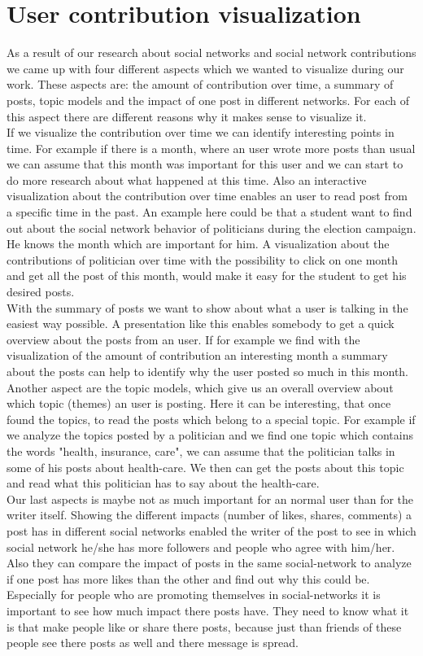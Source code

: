 \section{User contribution visualization}

As a result of our research about social networks and social network contributions we came up with four different aspects which we wanted to visualize during our work. These aspects are: the amount of contribution over time, a summary of posts, topic models and the impact of one post in different networks. For each of this aspect there are different reasons why it makes sense to visualize it. \\
If we visualize the contribution over time we can identify interesting points in time. For example if there is a month, where an user wrote more posts than usual we can assume that this month was important for this user and we can start to do more research about what happened at this time. Also an interactive visualization about the contribution over time enables an user to read post from a specific time in the past. An example here could be that a student want to find out about the social network behavior of politicians during the election campaign. He knows the month which are important for him. A visualization about the contributions of politician over time with the possibility to click on one month and get all the post of this month, would make it easy for the student to get his desired posts. \\
With the summary of posts we want to show about what a user is talking in the easiest way possible. A presentation like this enables somebody to get a quick overview about the posts from an user. If for example we find with the visualization of the amount of contribution an interesting month  a summary about the posts can help to identify why the user posted so much in this month. \\
Another aspect are the topic models, which give us an overall overview about which topic (themes) an user is posting. Here it can be interesting, that once found the topics, to read the posts which belong to a special topic. For example if we analyze the topics posted by a politician and we find one topic which contains the words "health, insurance, care", we can assume that the politician talks  in some of his posts about health-care. We then can get the posts about this topic and read what this politician has to say about the health-care. \\
Our last aspects is maybe not as much important for an normal user than for the writer itself. Showing the different impacts (number of likes, shares, comments) a post has in different social networks enabled the writer of the post to see in which social network he/she has more followers and people who agree with him/her. Also they can compare the impact of posts in the same social-network to analyze if one post has more likes than the other and find out why this could be.  Especially for people who are promoting themselves in social-networks it is important to see how much impact there posts have. They need to know what it is that make people like or share there posts, because just than friends of these people see there posts as well and there message is spread. 




